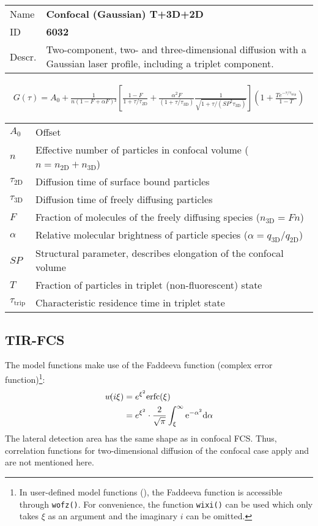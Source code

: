 \noindent \begin{tabular}{lp{}}
Name & \textbf{Confocal (Gaussian) T+3D+2D} \\ 
ID & \textbf{6032} \\ 
Descr. &  Two-component, two- and three-dimensional diffusion with a Gaussian laser profile, including a triplet component\cite{Elson1974, Aragon1976, Palmer1987}. \\ 
\end{tabular}
\begin{align}
G(\tau) = A_0 + \frac{1}{n (1 - F + \alpha F)²} \left[ \frac{1-F}{1+\tau/\tau_\mathrm{2D}} + \frac{ \alpha^2 F}{ (1+\tau/\tau_\mathrm{3D}) } \frac{1}{\sqrt{1+\tau/(\mathit{SP}^2 \tau_\mathrm{3D})}} \right] \left(1 + \frac{T e^{-\tau/\tau_\mathrm{trip}}}{1-T}  \right) 
\end{align} 
\begin{center}
\begin{tabular}{ll}
$A_0$ & Offset \\ 
$n$ & Effective number of particles in confocal volume ($n = n_\mathrm{2D}+n_\mathrm{3D}$) \\ 
$\tau_\mathrm{2D}$ &  Diffusion time of surface bound particles \\ 
$\tau_\mathrm{3D}$ &  Diffusion time of freely diffusing particles \\ 
$F$ & Fraction of molecules of the freely diffusing species ($n_\mathrm{3D} = F n$) \\
$\alpha$ & Relative molecular brightness of particle species ($ \alpha = q_\mathrm{3D}/q_\mathrm{2D}$) \\
$\mathit{SP}$ & Structural parameter, describes elongation of the confocal volume \\
$T$ &  Fraction of particles in triplet (non-fluorescent) state\\ 
$\tau_\mathrm{trip}$ &  Characteristic residence time in triplet state \\ 
\end{tabular}
\end{center}
\vspace{2em}

\subsection{TIR-FCS}
\label{sec:imple.tirfc}
The model functions make use of the Faddeeva function (complex error function)\footnote{In user-defined model functions (), the Faddeeva function is accessible through \texttt{wofz()}. For convenience, the function \texttt{wixi()} can be used which only takes $\xi$ as an argument and the imaginary $i$ can be omitted.}:
\begin{align}
w\!(i\xi) &= e^{\xi^2} \mathrm{erfc}(\xi) \\
\notag &= e^{\xi^2} \cdot  \frac{2}{\sqrt{\pi}} \int_\xi^\infty \mathrm{e}^{-\alpha^2} \mathrm{d\alpha} \label{eq:faddeeva}
\end{align} 
The lateral detection area has the same shape as in confocal FCS. Thus, correlation functions for two-dimensional diffusion of the confocal case apply and are not mentioned here.

